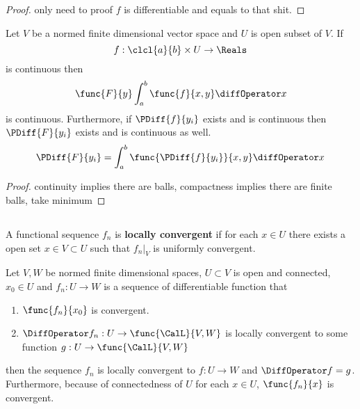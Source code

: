 \begin{proof}
    only need to proof \(f\) is differentiable and equals to that shit.
\end{proof}

\begin{corollary}
    Let \(V\) be a normed finite dimensional vector space and \(U\) is open subset of \(V\). If
    \begin{equation*}
        f :\clcl{a}{b} \times U \to \Reals
    \end{equation*}
    is continuous then
    \begin{equation*}
        \func{F}{y} \int_{a}^{b} \func{f}{x,y} \diffOperator x
    \end{equation*}
    is continuous. Furthermore, if \(\PDiff{f}{y_i}\) exists and is continuous then \(\PDiff{F}{y_i}\) exists and is continuous as well.
    \begin{equation*}
        \PDiff{F}{y_i} =  \int_{a}^{b} \func{\PDiff{f}{y_i}}{x,y} \diffOperator x
    \end{equation*}
\end{corollary}

\begin{proof}
    continuity implies there are balls, compactness implies there are finite balls, take minimum
\end{proof}

\subsection{}

\begin{definition}
    A functional sequence \(f_n\) is \textbf{locally convergent} if for each \(x \in U\)  there exists a open set \(x \in V \subset U\) such that \(\left. f_n \right|_V\) is uniformly convergent.
\end{definition}

\begin{theorem}
    Let \(V,W\) be normed finite dimensional spaces, \(U \subset V\) is open and connected, \(x_0 \in U\) and \(f_n : U \to W\) is a sequence of differentiable function that
    \begin{enumerate}
        \item \(\func{f_n}{x_0}\) is convergent.
        \item \(\DiffOperator f_n : U \to \func{\CalL}{V,W}\) is locally convergent to some function \(g : U \to \func{\CalL}{V,W}\)
    \end{enumerate}
    then the sequence \(f_n\) is locally convergent to \(f : U \to W\) and \(\DiffOperator f = g\). Furthermore, because of connectedness of \(U\) for each \(x \in U\), \(\func{f_n}{x}\) is convergent.
\end{theorem}

